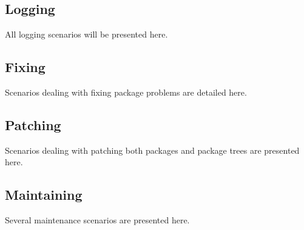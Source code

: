 




\subsection{Logging}
All logging scenarios will be presented here.








\subsection{Fixing}
Scenarios dealing with fixing package problems are detailed here.










\subsection{Patching}
Scenarios dealing with patching both packages and package trees are presented here.





\subsection{Maintaining}
Several maintenance scenarios are presented here.





